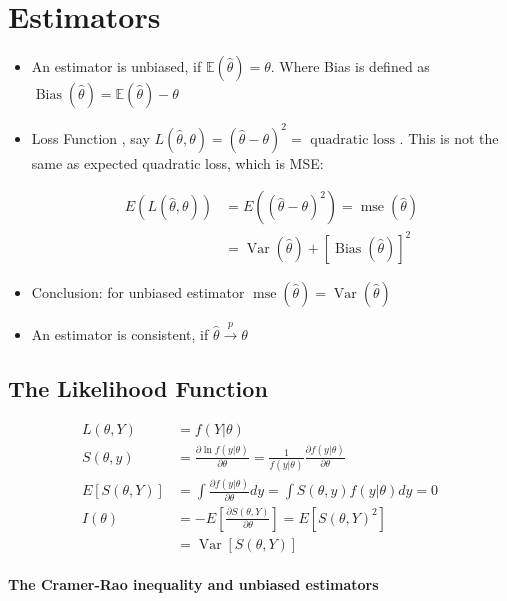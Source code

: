 \section{Estimators}

\begin{itemize}
    \item An estimator is unbiased, if $\mathbb{E}(\hat{\theta})=\theta$. Where Bias is defined as $\operatorname{Bias}(\hat{\theta})= \mathbb{E}(\hat{\theta})-\theta$
    \item Loss Function , say $L(\hat{\theta}, \theta)=(\hat{\theta}-\theta)^2=\text { quadratic loss }$. This is not the same as expected quadratic loss, which is MSE:
    
    \begin{align*}
        E (L(\hat{\theta}, \theta))&= E \left((\hat{\theta}-\theta)^2\right)=\operatorname{mse}(\hat{\theta}) \\
        &= \operatorname{Var}(\hat{\theta})+[\operatorname{Bias}(\hat{\theta})]^2
    \end{align*}
    \item Conclusion: for unbiased estimator $\operatorname{mse}(\hat{\theta})=\operatorname{Var}(\hat{\theta})$
    \item An estimator is consistent, if $\hat{\theta} \stackrel{p}{\rightarrow} \theta$
\end{itemize}

\subsection{The Likelihood Function}

\begin{align*}
    L (\theta, Y)&=f(Y | \theta) \\
    S(\theta, y)&=\frac{\partial \ln f(y | \theta)}{\partial \theta}=\frac{1}{f(y | \theta)} \frac{\partial f(y | \theta)}{\partial \theta}\\
    E [S(\theta, Y)]&=\int \frac{\partial f(y | \theta)}{\partial \theta} d y=\int S(\theta, y) f(y | \theta) d y= 0\\
    I (\theta)&=- E \left[\frac{\partial S(\theta, Y)}{\partial \theta}\right] = E \left[S(\theta, Y)^2\right]\\
    &=\operatorname{Var}[S(\theta, Y)]
\end{align*}

\paragraph{The Cramer-Rao inequality and unbiased estimators}

